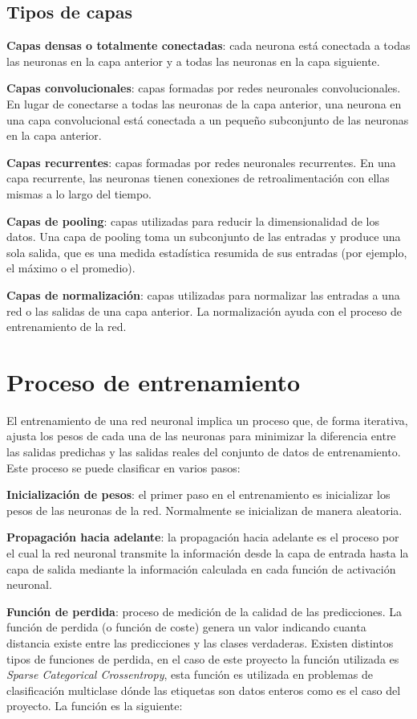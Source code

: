\subsection{Tipos de capas}

\textbf{Capas densas o totalmente conectadas}: cada neurona está conectada a todas las neuronas en la capa anterior y a todas las neuronas en la capa siguiente.

\textbf{Capas convolucionales}: capas formadas por redes neuronales convolucionales. En lugar de conectarse a todas las neuronas de la capa anterior, una neurona en una capa convolucional está conectada a un pequeño subconjunto de las neuronas en la capa anterior.

\textbf{Capas recurrentes}: capas formadas por redes neuronales recurrentes. En una capa recurrente, las neuronas tienen conexiones de retroalimentación con ellas mismas a lo largo del tiempo.

\textbf{Capas de pooling}: capas utilizadas para reducir la dimensionalidad de los datos. Una capa de pooling toma un subconjunto de las entradas y produce una sola salida, que es una medida estadística resumida de sus entradas (por ejemplo, el máximo o el promedio).

\textbf{Capas de normalización}: capas utilizadas para normalizar las entradas a una red o las salidas de una capa anterior. La normalización ayuda con el proceso de entrenamiento de la red.

\section{Proceso de entrenamiento}
El entrenamiento de una red neuronal implica un proceso que, de forma iterativa, ajusta los pesos de cada una de las neuronas para minimizar la diferencia entre las salidas predichas y las salidas reales del conjunto de datos de entrenamiento. Este proceso se puede clasificar en varios pasos:

\textbf{Inicialización de pesos}: el primer paso en el entrenamiento es inicializar los pesos de las neuronas de la red. Normalmente se inicializan de manera aleatoria.

\textbf{Propagación hacia adelante}: la propagación hacia adelante es el proceso por el cual la red neuronal transmite la información desde la capa de entrada hasta la capa de salida mediante la información calculada en cada función de activación neuronal.

\textbf{Función de perdida}: proceso de medición de la calidad de las predicciones. La función de perdida (o función de coste) genera un valor indicando cuanta distancia existe entre las predicciones y las clases verdaderas. Existen distintos tipos de funciones de perdida, en el caso de este proyecto la función utilizada es \textit{Sparse Categorical Crossentropy}, esta función es utilizada en problemas de clasificación multiclase dónde las etiquetas son datos enteros como es el caso del proyecto.
La función es la siguiente:

